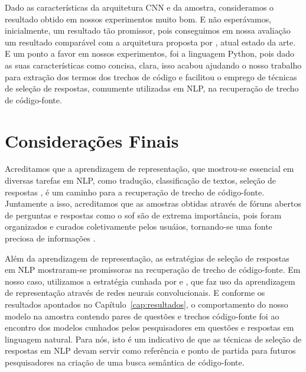 Dado as características da arquitetura CNN e da amostra, consideramos o resultado obtido em nossos experimentos muito bom. E não esperávamos, inicialmente, um resultado tão promissor, pois conseguimos em nossa avaliação um resultado comparável com a arquitetura proposta por \cite{cambronero-deep-learning-code-search:2019}, atual estado da arte. E um ponto a favor em nossos experimentos, foi a linguagem Python, pois dado as suas características como concisa, clara, isso acabou ajudando o nosso trabalho para extração dos termos dos trechos de código e facilitou o emprego de técnicas de seleção de respostas, comumente utilizadas em NLP, na recuperação de trecho de código-fonte.


\section{Considerações Finais} 
\label{sec:consideracoes-finais}

Acreditamos que a aprendizagem de representação, que mostrou-se essencial em diversas tarefas em NLP, como tradução, classificação de textos, seleção de respostas \citep{devlin-etal-2019-bert, yang2019xlNet}, é um caminho para a recuperação de trecho de código-fonte. Juntamente a isso, acreditamos que as amostras obtidas através de fóruns abertos de perguntas e respostas como o \Gls{sof} são de extrema importância, pois foram organizados e curados coletivamente pelos usuáios, tornando-se uma fonte preciosa de informações \citep{Wang-quora:2013}.

Além da aprendizagem de representação, as estratégias de seleção de respostas em NLP mostraram-se promissoras na recuperação de trecho de código-fonte. Em nosso caso, utilizamos a estratégia cunhada por \cite{feng-2015} e \cite{tan-lstm-qa}, que faz uso da aprendizagem de representação através de redes neurais convolucionais. E conforme os resultados apontados no Capítulo~\ref{cap:resultados}, o comportamento do nosso modelo na amostra contendo pares de questões e trechos código-fonte foi ao encontro dos modelos cunhados pelos pesquisadores em questões e respostas em linguagem natural. Para nós, isto é um indicativo de que as técnicas de seleção de respostas em NLP devam servir como referência e ponto de partida para futuros pesquisadores na criação de uma busca semântica de código-fonte.

